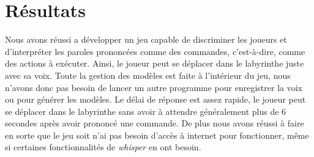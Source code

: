 \section{Résultats}
\label{sec:resultats}

Nous avons réussi a développer un jeu capable de discriminer les joueurs et d'interpréter les paroles prononcées comme des commandes, c'est-à-dire, comme des
actions à exécuter. Ainsi, le joueur peut se déplacer dans le labyrinthe juste avec sa voix. Toute la gestion des modèles est faite à l'intérieur du jeu, nous
n'avons donc pas besoin de lancer un autre programme pour enregistrer la voix ou pour générer les modèles. Le délai de réponse est assez rapide, le joueur
peut se déplacer dans le labyrinthe sans avoir à attendre généralement plus de 6 secondes après avoir prononcé une commande. De plus nous avons réussi à faire
en sorte que le jeu soit n'ai pas besoin d'accès à internet pour fonctionner, même si certaines fonctionnalités de \textit{whisper} en ont besoin.

